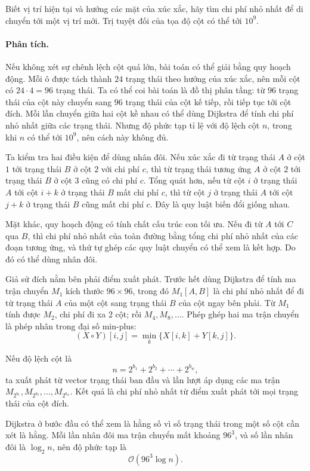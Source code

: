 \documentclass[11pt]{article}
\newcommand{\Oh}{\mathcal{O}}
\begin{document}
Biết vị trí hiện tại và hướng các mặt của xúc xắc, hãy tìm chi phí nhỏ nhất để
di chuyển tới một vị trí mới. Trị tuyệt đối của tọa độ cột có thể tới
$10^9$.

\paragraph{Phân tích.}
Nếu không xét sự chênh lệch cột quá lớn, bài toán có thể giải bằng quy hoạch
động. Mỗi ô được tách thành $24$ trạng thái theo hướng của xúc xắc, nên mỗi
cột có $24\cdot 4=96$ trạng thái. Ta có thể coi bài toán là đồ thị phân tầng:
từ $96$ trạng thái của cột này chuyển sang $96$ trạng thái của cột kế tiếp,
rồi tiếp tục tới cột đích. Mỗi lần chuyển giữa hai cột kề nhau có thể dùng
Dijkstra để tính chi phí nhỏ nhất giữa các trạng thái. Nhưng độ phức tạp tỉ
lệ với độ lệch cột $n$, trong khi $n$ có thể tới $10^9$, nên cách này không
đủ.

Ta kiểm tra hai điều kiện để dùng nhân đôi. Nếu xúc xắc đi từ trạng thái $A$
ở cột $1$ tới trạng thái $B$ ở cột $2$ với chi phí $c$, thì từ trạng thái
tương ứng $A$ ở cột $2$ tới trạng thái $B$ ở cột $3$ cũng có chi phí $c$.
Tổng quát hơn, nếu từ cột $i$ ở trạng thái $A$ tới cột $i+k$ ở trạng thái
$B$ mất chi phí $c$, thì từ cột $j$ ở trạng thái $A$ tới cột $j+k$ ở trạng
thái $B$ cũng mất chi phí $c$. Đây là quy luật biến đổi giống nhau.

Mặt khác, quy hoạch động có tính chất cấu trúc con tối ưu. Nếu đi từ $A$ tới
$C$ qua $B$, thì chi phí nhỏ nhất của toàn đường bằng tổng chi phí nhỏ nhất
của các đoạn tương ứng, và thứ tự ghép các quy luật chuyển có thể xem là kết
hợp. Do đó có thể dùng nhân đôi.

Giả sử đích nằm bên phải điểm xuất phát. Trước hết dùng Dijkstra để tính ma
trận chuyển $M_1$ kích thước $96\times 96$, trong đó $M_1[A,B]$ là chi phí nhỏ
nhất để đi từ trạng thái $A$ của một cột sang trạng thái $B$ của cột ngay bên
phải. Từ $M_1$ tính được $M_2$, chi phí đi xa $2$ cột; rồi $M_4,M_8,\ldots$.
Phép ghép hai ma trận chuyển là phép nhân trong đại số min-plus:
\[
  (X\circ Y)[i,j]=\min_k\{X[i,k]+Y[k,j]\}.
\]

Nếu độ lệch cột là
\[
  n=2^{b_1}+2^{b_2}+\cdots+2^{b_w},
\]
ta xuất phát từ vector trạng thái ban đầu và lần lượt áp dụng các ma trận
$M_{2^{b_1}},M_{2^{b_2}},\ldots,M_{2^{b_w}}$. Kết quả là chi phí nhỏ nhất từ
điểm xuất phát tới mọi trạng thái của cột đích.

Dijkstra ở bước đầu có thể xem là hằng số vì số trạng thái trong một số cột
cần xét là hằng. Mỗi lần nhân đôi ma trận chuyển mất khoảng $96^3$, và số lần
nhân đôi là $\log_2 n$, nên độ phức tạp là
\[
  \Oh(96^3\log n).
\]
\end{document}

